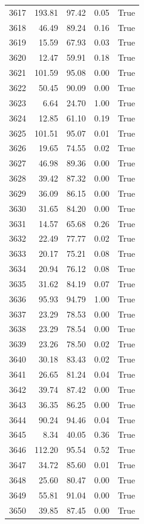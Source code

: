 \begin{longtable}{rrrrr}
3617 & 193.81 & 97.42 & 0.05 & True \\
3618 & 46.49 & 89.24 & 0.16 & True \\
3619 & 15.59 & 67.93 & 0.03 & True \\
3620 & 12.47 & 59.91 & 0.18 & True \\
3621 & 101.59 & 95.08 & 0.00 & True \\
3622 & 50.45 & 90.09 & 0.00 & True \\
3623 & 6.64 & 24.70 & 1.00 & True \\
3624 & 12.85 & 61.10 & 0.19 & True \\
3625 & 101.51 & 95.07 & 0.01 & True \\
3626 & 19.65 & 74.55 & 0.02 & True \\
3627 & 46.98 & 89.36 & 0.00 & True \\
3628 & 39.42 & 87.32 & 0.00 & True \\
3629 & 36.09 & 86.15 & 0.00 & True \\
3630 & 31.65 & 84.20 & 0.00 & True \\
3631 & 14.57 & 65.68 & 0.26 & True \\
3632 & 22.49 & 77.77 & 0.02 & True \\
3633 & 20.17 & 75.21 & 0.08 & True \\
3634 & 20.94 & 76.12 & 0.08 & True \\
3635 & 31.62 & 84.19 & 0.07 & True \\
3636 & 95.93 & 94.79 & 1.00 & True \\
3637 & 23.29 & 78.53 & 0.00 & True \\
3638 & 23.29 & 78.54 & 0.00 & True \\
3639 & 23.26 & 78.50 & 0.02 & True \\
3640 & 30.18 & 83.43 & 0.02 & True \\
3641 & 26.65 & 81.24 & 0.04 & True \\
3642 & 39.74 & 87.42 & 0.00 & True \\
3643 & 36.35 & 86.25 & 0.00 & True \\
3644 & 90.24 & 94.46 & 0.04 & True \\
3645 & 8.34 & 40.05 & 0.36 & True \\
3646 & 112.20 & 95.54 & 0.52 & True \\
3647 & 34.72 & 85.60 & 0.01 & True \\
3648 & 25.60 & 80.47 & 0.00 & True \\
3649 & 55.81 & 91.04 & 0.00 & True \\
3650 & 39.85 & 87.45 & 0.00 & True \\

\end{longtable}
